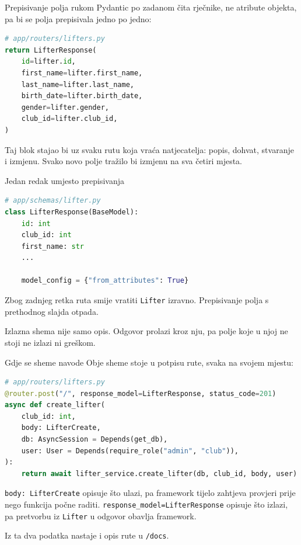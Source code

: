 \begin{frame}[fragile]{Prepisivanje polja rukom}
Pydantic po zadanom čita rječnike, ne atribute objekta, pa bi se polja prepisivala jedno po jedno:

\begin{lstlisting}[language=python]
# app/routers/lifters.py
return LifterResponse(
    id=lifter.id,
    first_name=lifter.first_name,
    last_name=lifter.last_name,
    birth_date=lifter.birth_date,
    gender=lifter.gender,
    club_id=lifter.club_id,
)
\end{lstlisting}

\vspace{0.4em}
Taj blok stajao bi uz svaku rutu koja vraća natjecatelja: popis, dohvat, stvaranje i izmjenu. Svako novo polje tražilo bi izmjenu na sva četiri mjesta.
\end{frame}

\begin{frame}[fragile]{Jedan redak umjesto prepisivanja}
\begin{lstlisting}[language=python]
# app/schemas/lifter.py
class LifterResponse(BaseModel):
    id: int
    club_id: int
    first_name: str
    ...

    model_config = {"from_attributes": True}
\end{lstlisting}

\vspace{0.4em}
Zbog zadnjeg retka ruta smije vratiti \texttt{Lifter} izravno. Prepisivanje polja s prethodnog slajda otpada.

\vspace{0.7em}
Izlazna shema nije samo opis. Odgovor prolazi kroz nju, pa polje koje u njoj ne stoji ne izlazi ni greškom.
\end{frame}

\begin{frame}[fragile]{Gdje se sheme navode}
Obje sheme stoje u potpisu rute, svaka na svojem mjestu:

\begin{lstlisting}[language=python]
# app/routers/lifters.py
@router.post("/", response_model=LifterResponse, status_code=201)
async def create_lifter(
    club_id: int,
    body: LifterCreate,
    db: AsyncSession = Depends(get_db),
    user: User = Depends(require_role("admin", "club")),
):
    return await lifter_service.create_lifter(db, club_id, body, user)
\end{lstlisting}

\vspace{0.4em}
\texttt{body: LifterCreate} opisuje što ulazi, pa framework tijelo zahtjeva provjeri prije nego funkcija počne raditi. \texttt{response\_model=LifterResponse} opisuje što izlazi, pa pretvorbu iz \texttt{Lifter} u odgovor obavlja framework.

\vspace{0.7em}
Iz ta dva podatka nastaje i opis rute u \texttt{/docs}.
\end{frame}

